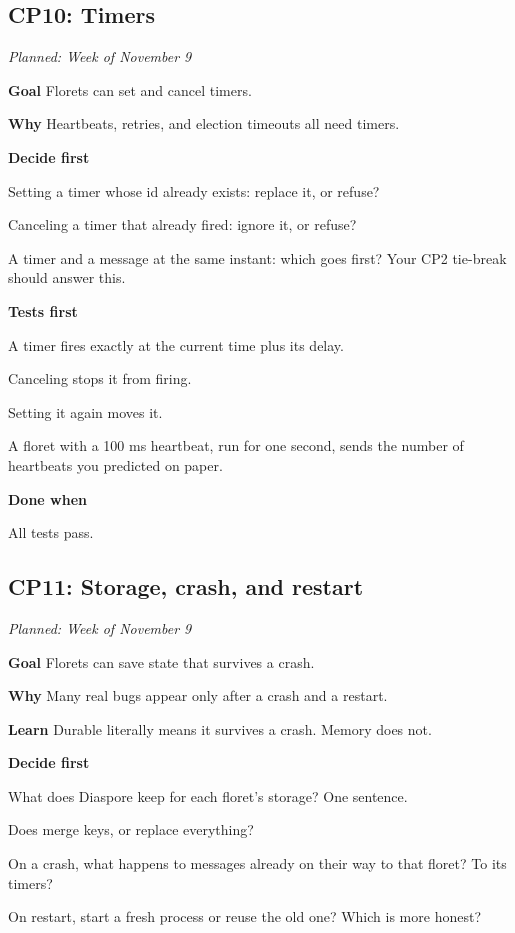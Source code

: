 \documentclass[11pt,letterpaper]{article}
\newcommand{\code}[1]{\texttt{\detokenize{#1}}}
\newcommand{\lbl}[1]{\textbf{#1}\enspace}
\newcommand{\when}[1]{\par\textit{Planned: #1}\par}
\begin{document}
\subsection{CP10: Timers}
\when{Week of November 9}

\lbl{Goal} Florets can set and cancel timers.

\lbl{Why} Heartbeats, retries, and election timeouts all need timers.

\lbl{Decide first}
\begin{asks}
  \item Setting a timer whose id already exists: replace it, or refuse?
  \item Canceling a timer that already fired: ignore it, or refuse?
  \item A timer and a message at the same instant: which goes first? Your CP2 tie-break should answer this.
\end{asks}

\lbl{Tests first}
\begin{checks}
  \item A timer fires exactly at the current time plus its delay.
  \item Canceling stops it from firing.
  \item Setting it again moves it.
  \item A floret with a 100 ms heartbeat, run for one second, sends the number of heartbeats you predicted on paper.
\end{checks}

\lbl{Done when}
\begin{checks}
  \item All tests pass.
\end{checks}

\subsection{CP11: Storage, crash, and restart}
\when{Week of November 9}

\lbl{Goal} Florets can save state that survives a crash.

\lbl{Why} Many real bugs appear only after a crash and a restart.

\lbl{Learn} Durable literally means it survives a crash. Memory does not.

\lbl{Decide first}
\begin{asks}
  \item What does Diaspore keep for each floret's storage? One sentence.
  \item Does \code{store} merge keys, or replace everything?
  \item On a crash, what happens to messages already on their way to that floret? To its timers?
  \item On restart, start a fresh process or reuse the old one? Which is more honest?
\end{asks}
\end{document}
